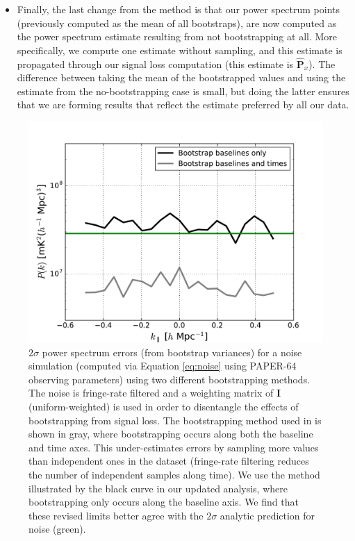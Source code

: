 \documentclass[preprint2,numberedappendix,tighten]{aastex6}  %
\begin{document}
\begin{itemize}
\item{Finally, the last change from the  method is that our power spectrum points (previously computed as the mean of all bootstraps), are now computed as the power spectrum estimate resulting from not bootstrapping at all. More specifically, we compute one estimate without sampling, and this estimate is propagated through our signal loss computation (this estimate is $\widehat{\textbf{P}}_{x}$). The difference between taking the mean of the bootstrapped values and using the estimate from the no-bootstrapping case is small, but doing the latter ensures that we are forming results that reflect the estimate preferred by all our data.}

\end{itemize}

\begin{figure}
	\centering
	\includegraphics[trim={0.3cm 0cm 0.3cm 0.3cm},width=\columnwidth]{plots/noise_errors.pdf}
	\caption{$2\sigma$ power spectrum errors (from bootstrap variances) for a noise simulation (computed via Equation \eqref{eq:noise} using PAPER-64 observing parameters) using two different bootstrapping 
methods. The noise is fringe-rate filtered and a weighting matrix of $\textbf{I}$ (uniform-weighted) is used in order to disentangle the 
effects of bootstrapping from signal loss. The bootstrapping method used in  is shown in gray, where bootstrapping occurs along both the baseline and time axes. This under-estimates errors by sampling more values than independent ones in the dataset (fringe-rate filtering reduces the number of independent samples along time). We use the method illustrated by the black curve in our updated analysis, where bootstrapping only occurs along the baseline axis. We find that these revised limits better agree with the $2\sigma$ analytic prediction for noise (green).}
	\label{fig:data_errors}
\end{figure}
\end{document}

